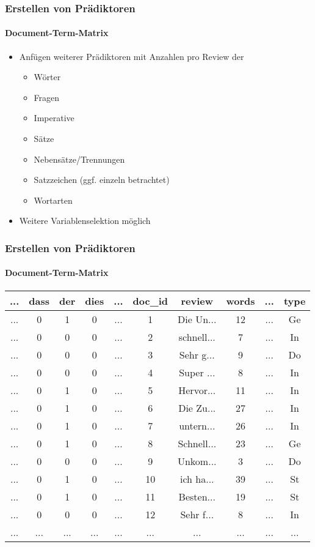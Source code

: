\begin{frame}
\frametitle{Erstellen von Prädiktoren}
\framesubtitle{Document-Term-Matrix}
\begin{itemize}\itemsep12pt
\item Anfügen weiterer Prädiktoren mit Anzahlen pro Review der
\begin{itemize}
\item Wörter %
\item Fragen %
\item Imperative %
\item Sätze %
\item Nebensätze/Trennungen %
\item Satzzeichen %
(ggf. einzeln betrachtet)
\item Wortarten %
\end{itemize} 
\item Weitere Variablenselektion möglich

\end{itemize}
\end{frame}

\begin{frame}
\frametitle{Erstellen von Prädiktoren}
\framesubtitle{Document-Term-Matrix}
\vspace{12pt}
\begin{tabular}{|c|c|c|c|c|c|c|c|c|c|}
\hline
...	&dass&  der 	& dies & ... & doc\_id	& review & words & ...& type\\
\hline
... &0& 1		& 0		&	...	& 1		& Die Un...&12 			& ...& Ge\\
...	& 0&0		& 0		&	...	& 2		& schnell...&7 			& ...& In\\
...	& 0&0		& 0		&	...	& 3		& Sehr g...&9 			& ...& Do\\
...	& 0&0		& 0		&	...	& 4		& Super ...&8 			& ...& In\\
...	& 0&1		& 0		&	...	& 5		& Hervor...&11 			& ...& In\\
...	& 0&1		& 0		&	...& 6		& Die Zu...&27 			& ...& In\\
...	& 0&1		& 0		&	...& 7		& untern...&26 			& ...& In\\
...	& 0&1		& 0		&	...& 8		& Schnell...&23 			& ...& Ge\\
...	& 0&0		& 0		&	...& 9		& Unkom...&3 			& ...& Do\\
...	& 0&1		& 0		&	...& 10	& ich ha...&39 			& ...& St\\
...	& 0&1		& 0		&	...	& 11	& Besten...&19 			& ...& St\\
...	& 0&0		& 0		&...	& 12	& Sehr f...&8 			& ...& In\\
...	& ...&...	&...	&	...	& ...  	& ...		&... 			& ...& ...\\
\hline
\end{tabular}


\end{frame}
